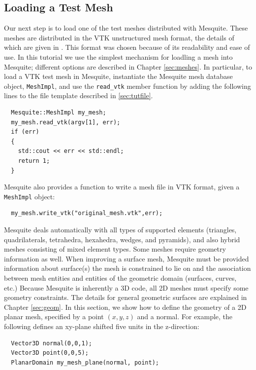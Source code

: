 \subsection{Loading a Test Mesh}
\label{sec:tutMesh}
Our next step is to load one of the test meshes distributed with
Mesquite.  These meshes are distributed in the VTK unstructured mesh
format, the details of which are given in \cite{VTKbook, VTKuml}. This
format was chosen because of its readability and ease of use.
In this tutorial we use
the simplest mechanism for loadling a mesh into Mesquite; different
options are described in Chapter \ref{sec:meshes}.  In particular, to
load a VTK test mesh in Mesquite, instantiate the Mesquite mesh
database object,
\texttt{MeshImpl}, and use the \texttt{read\_vtk} member function by
adding the following lines to the file template described in
\ref{sec:tutfile}.
\begin{verbatim}
  Mesquite::MeshImpl my_mesh;
  my_mesh.read_vtk(argv[1], err); 
  if (err) 
  {
    std::cout << err << std::endl;
    return 1;
  }
\end{verbatim}

Mesquite also provides a function to write a mesh
file in VTK format, given a \texttt{MeshImpl} object:
\begin{verbatim}
  my_mesh.write_vtk("original_mesh.vtk",err); 
\end{verbatim}

Mesquite deals automatically with all types of supported elements 
(triangles, quadrilaterals, tetrahedra, hexahedra, wedges, and pyramids),
and also hybrid meshes consisting of mixed element types.  
Some meshes require geometry information as well.  When improving a surface mesh, Mesquite must be provided information
about surface(s) the mesh is constrained to lie on and the association between
mesh entities and entities of the geometric domain (surfaces, curves, etc.)
Because Mesquite is inherently a 3D code, all 2D meshes must specify some
geometry constraints.  The details
for general geometric surfaces are explained in Chapter 
\ref{sec:geom}. In this section,
we show how to define the geometry of a 2D planar mesh, specified by a
point $(x,y,z)$ and a normal. For example, the following defines an xy-plane
shifted five units in the z-direction:
\begin{verbatim}
  Vector3D normal(0,0,1);
  Vector3D point(0,0,5);
  PlanarDomain my_mesh_plane(normal, point);
\end{verbatim}


